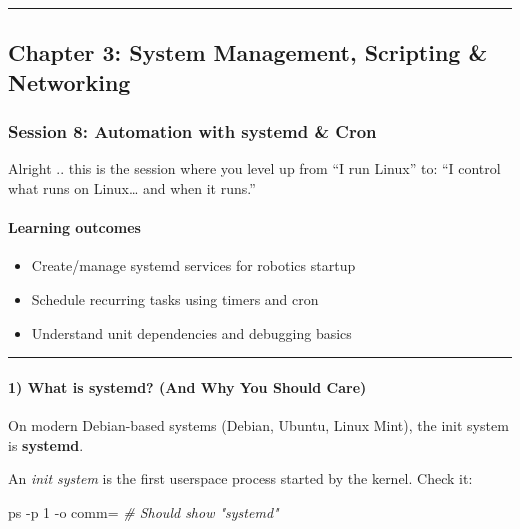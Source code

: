 \documentclass[
  english,
  paper=a4,
  oneside  ,captions=tableheading
]{scrartcl}
\newenvironment{Shaded}{}{}
\newcommand{\AttributeTok}[1]{\textcolor[rgb]{0.49,0.56,0.16}{#1}}
\newcommand{\CommentTok}[1]{\textcolor[rgb]{0.38,0.63,0.69}{\textit{#1}}}
\newcommand{\FunctionTok}[1]{\textcolor[rgb]{0.02,0.16,0.49}{#1}}
\newcommand{\NormalTok}[1]{#1}
\providecommand{\tightlist}{%
  \setlength{\itemsep}{0pt}\setlength{\parskip}{0pt}}
\renewenvironment{quote}{\begin{customblockquote}\list{}{\rightmargin=0em\leftmargin=0em}%
\item\relax\color{blockquote-text}\ignorespaces}{\unskip\unskip\endlist\end{customblockquote}}
\begin{document}
\begin{center}\rule{0.5\linewidth}{0.5pt}\end{center}

\subsection{Chapter 3: System Management, Scripting \&
Networking}\label{chapter-3-system-management-scripting-networking}

\subsubsection{Session 8: Automation with systemd \&
Cron}\label{session-8-automation-with-systemd-cron}

\begin{quote}
Alright .. this is the session where you level up from ``I run Linux''
to: ``I control what runs on Linux\ldots{} and when it runs.''
\end{quote}

\paragraph{Learning outcomes}\label{learning-outcomes-7}

\begin{itemize}
\tightlist
\item
  Create/manage systemd services for robotics startup
\item
  Schedule recurring tasks using timers and cron
\item
  Understand unit dependencies and debugging basics
\end{itemize}

\begin{center}\rule{0.5\linewidth}{0.5pt}\end{center}

\paragraph{1) What is systemd? (And Why You Should
Care)}\label{what-is-systemd-and-why-you-should-care}

On modern Debian-based systems (Debian, Ubuntu, Linux Mint), the init
system is \textbf{systemd}.

An \emph{init system} is the first userspace process started by the
kernel. Check it:

\begin{Shaded}
\begin{Highlighting}[]
\FunctionTok{ps} \AttributeTok{{-}p}\NormalTok{ 1 }\AttributeTok{{-}o}\NormalTok{ comm=    }\CommentTok{\# Should show "systemd"}
\end{Highlighting}
\end{Shaded}
\end{document}
